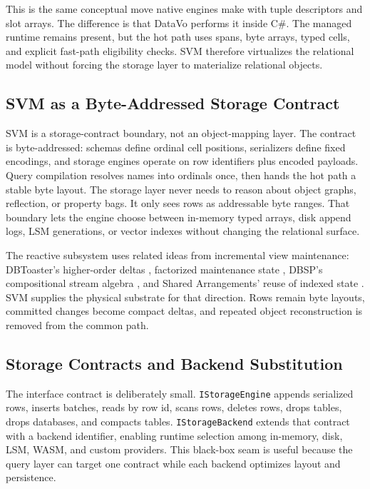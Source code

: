 \documentclass[11pt]{article}
\begin{document}
This is the same conceptual move native engines make with tuple descriptors and slot arrays. The difference is that DataVo performs it inside C\#. The managed runtime remains present, but the hot path uses spans, byte arrays, typed cells, and explicit fast-path eligibility checks. SVM therefore virtualizes the relational model without forcing the storage layer to materialize relational objects.

\subsection{SVM as a Byte-Addressed Storage Contract}
SVM is a storage-contract boundary, not an object-mapping layer. The contract is byte-addressed: schemas define ordinal cell positions, serializers define fixed encodings, and storage engines operate on row identifiers plus encoded payloads. Query compilation resolves names into ordinals once, then hands the hot path a stable byte layout. The storage layer never needs to reason about object graphs, reflection, or property bags. It only sees rows as addressable byte ranges. That boundary lets the engine choose between in-memory typed arrays, disk append logs, LSM generations, or vector indexes without changing the relational surface.

The reactive subsystem uses related ideas from incremental view maintenance: DBToaster's higher-order deltas \cite{dbtoaster}, factorized maintenance state \cite{fivm}, DBSP's compositional stream algebra \cite{dbsp}, and Shared Arrangements' reuse of indexed state \cite{shared-arrangements}. SVM supplies the physical substrate for that direction. Rows remain byte layouts, committed changes become compact deltas, and repeated object reconstruction is removed from the common path.

\subsection{Storage Contracts and Backend Substitution}
The interface contract is deliberately small. \texttt{IStorageEngine} appends serialized rows, inserts batches, reads by row id, scans rows, deletes rows, drops tables, drops databases, and compacts tables. \texttt{IStorageBackend} extends that contract with a backend identifier, enabling runtime selection among in-memory, disk, LSM, WASM, and custom providers. This black-box seam is useful because the query layer can target one contract while each backend optimizes layout and persistence.
\end{document}
